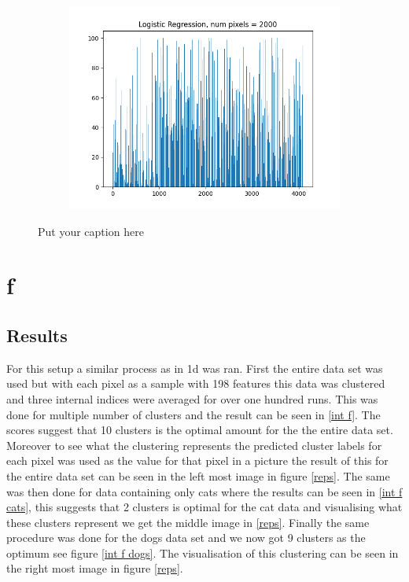 \documentclass{article}
\begin{document}
\begin{figure}[H]
\begin{subfigure}{.33\textwidth}
  \label{fig:sub-second}
\end{subfigure}
\begin{subfigure}{.33\textwidth}
  \centering
  \includegraphics[width=1\linewidth]{2e/Logistic Regression, 2000.png}  
  
  \label{fig:sub-second}
\end{subfigure}
\caption{Put your caption here}
\label{feet histo 2e}
\end{figure}
\newpage
\section{f}
\subsection{Results}
For this setup a similar process as in 1d was ran. First the entire data set was used but with each pixel as a sample with 198 features this data was clustered and three internal indices were averaged for over one hundred runs. This was done for multiple number of clusters and the result can be seen in \ref{int f}. The scores suggest that 10 clusters is the optimal amount for the the entire data set. Moreover to see what the clustering represents the predicted cluster labels for each pixel was used as the value for that pixel in a picture the result of this for the entire data set can be seen in the left most image in figure \ref{reps}. The same was then done for data containing only cats where the results can be seen in \ref{int f cats}, this suggests that 2 clusters is optimal for the cat data and visualising what these clusters represent we get the middle image in \ref{reps}. Finally the same procedure was done for the dogs data set and we now got 9 clusters as the optimum see figure \ref{int f dogs}. The visualisation of this clustering can be seen in the right most image in figure \ref{reps}.  
\end{document}
